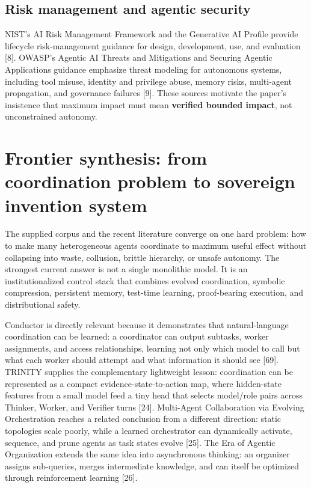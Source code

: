 \documentclass[11pt]{article}
\begin{document}
\subsection{Risk management and agentic security}\label{risk-management-and-agentic-security}

NIST's AI Risk Management Framework and the Generative AI Profile provide lifecycle risk-management guidance for design, development, use, and evaluation {[}8{]}. OWASP's Agentic AI Threats and Mitigations and Securing Agentic Applications guidance emphasize threat modeling for autonomous systems, including tool misuse, identity and privilege abuse, memory risks, multi-agent propagation, and governance failures {[}9{]}. These sources motivate the paper's insistence that maximum impact must mean \textbf{verified bounded impact}, not unconstrained autonomy.

\section{Frontier synthesis: from coordination problem to sovereign invention system}\label{frontier-synthesis-from-coordination-problem-to-sovereign-invention-system}

The supplied corpus and the recent literature converge on one hard problem: how to make many heterogeneous agents coordinate to maximum useful effect without collapsing into waste, collusion, brittle hierarchy, or unsafe autonomy. The strongest current answer is not a single monolithic model. It is an institutionalized control stack that combines evolved coordination, symbolic compression, persistent memory, test-time learning, proof-bearing execution, and distributional safety.

Conductor is directly relevant because it demonstrates that natural-language coordination can be learned: a coordinator can output subtasks, worker assignments, and access relationships, learning not only which model to call but what each worker should attempt and what information it should see {[}69{]}. TRINITY supplies the complementary lightweight lesson: coordination can be represented as a compact evidence-state-to-action map, where hidden-state features from a small model feed a tiny head that selects model/role pairs across Thinker, Worker, and Verifier turns {[}24{]}. Multi-Agent Collaboration via Evolving Orchestration reaches a related conclusion from a different direction: static topologies scale poorly, while a learned orchestrator can dynamically activate, sequence, and prune agents as task states evolve {[}25{]}. The Era of Agentic Organization extends the same idea into asynchronous thinking: an organizer assigns sub-queries, merges intermediate knowledge, and can itself be optimized through reinforcement learning {[}26{]}.
\end{document}
